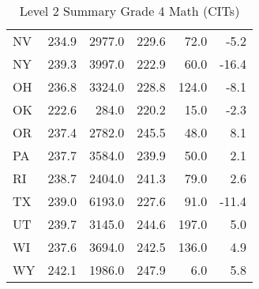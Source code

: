 \begin{table}[ht]
\begin{center}
\begin{tabular}{lrr@{\extracolsep{10pt}}rr@{\extracolsep{10pt}}r}
  NV & 234.9 & 2977.0 & 229.6 & 72.0 & -5.2 \\ 
  NY & 239.3 & 3997.0 & 222.9 & 60.0 & -16.4 \\ 
  OH & 236.8 & 3324.0 & 228.8 & 124.0 & -8.1 \\ 
  OK & 222.6 & 284.0 & 220.2 & 15.0 & -2.3 \\ 
  OR & 237.4 & 2782.0 & 245.5 & 48.0 & 8.1 \\ 
  PA & 237.7 & 3584.0 & 239.9 & 50.0 & 2.1 \\ 
  RI & 238.7 & 2404.0 & 241.3 & 79.0 & 2.6 \\ 
  TX & 239.0 & 6193.0 & 227.6 & 91.0 & -11.4 \\ 
  UT & 239.7 & 3145.0 & 244.6 & 197.0 & 5.0 \\ 
  WI & 237.6 & 3694.0 & 242.5 & 136.0 & 4.9 \\ 
  WY & 242.1 & 1986.0 & 247.9 & 6.0 & 5.8 \\ 
   \hline
\end{tabular}
\caption{Level 2 Summary Grade 4 Math (CITs)}
\label{g4mathCIT2}
\end{center}
\end{table}
